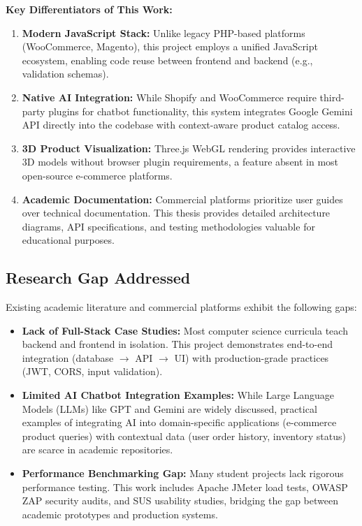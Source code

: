 \documentclass[12pt, a4paper]{report}
\begin{document}
\textbf{Key Differentiators of This Work:}
\begin{enumerate}
    \item \textbf{Modern JavaScript Stack:} Unlike legacy PHP-based platforms (WooCommerce, Magento), this project employs a unified JavaScript ecosystem, enabling code reuse between frontend and backend (e.g., validation schemas).
    
    \item \textbf{Native AI Integration:} While Shopify and WooCommerce require third-party plugins for chatbot functionality, this system integrates Google Gemini API directly into the codebase with context-aware product catalog access.
    
    \item \textbf{3D Product Visualization:} Three.js WebGL rendering provides interactive 3D models without browser plugin requirements, a feature absent in most open-source e-commerce platforms.
    
    \item \textbf{Academic Documentation:} Commercial platforms prioritize user guides over technical documentation. This thesis provides detailed architecture diagrams, API specifications, and testing methodologies valuable for educational purposes.
\end{enumerate}

\subsection{Research Gap Addressed}

Existing academic literature and commercial platforms exhibit the following gaps:

\begin{itemize}
    \item \textbf{Lack of Full-Stack Case Studies:} Most computer science curricula teach backend and frontend in isolation. This project demonstrates end-to-end integration (database $\rightarrow$ API $\rightarrow$ UI) with production-grade practices (JWT, CORS, input validation).
    
    \item \textbf{Limited AI Chatbot Integration Examples:} While Large Language Models (LLMs) like GPT and Gemini are widely discussed, practical examples of integrating AI into domain-specific applications (e-commerce product queries) with contextual data (user order history, inventory status) are scarce in academic repositories.
    
    \item \textbf{Performance Benchmarking Gap:} Many student projects lack rigorous performance testing. This work includes Apache JMeter load tests, OWASP ZAP security audits, and SUS usability studies, bridging the gap between academic prototypes and production systems.
\end{itemize}
\end{document}
